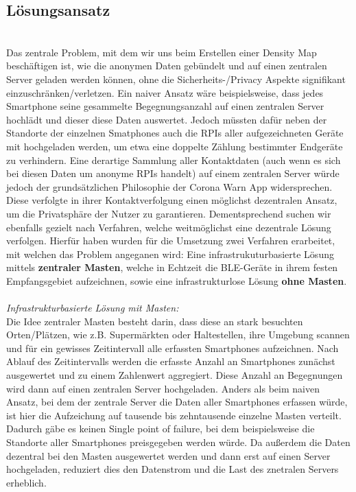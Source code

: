 \documentclass[conference,compsoc]{IEEEtran}
\begin{document}
\subsection{Lösungsansatz} \label{Lösungsansatz}
\text{ }\\
Das zentrale Problem, mit dem wir uns beim Erstellen einer Density Map beschäftigen ist, wie die anonymen Daten gebündelt und auf einen zentralen Server geladen werden können, ohne die Sicherheits-/Privacy Aspekte signifikant einzuschränken/verletzen. 
Ein naiver Ansatz wäre beispielsweise, dass jedes Smartphone seine gesammelte Begegnungsanzahl auf einen zentralen Server hochlädt und dieser diese Daten auswertet. 
Jedoch müssten dafür neben der Standorte der einzelnen Smatphones auch die RPIs aller aufgezeichneten Geräte mit hochgeladen werden, um etwa eine doppelte Zählung bestimmter Endgeräte zu verhindern. 
Eine derartige Sammlung aller Kontaktdaten (auch wenn es sich bei diesen Daten um anonyme RPIs handelt) auf einem zentralen Server würde jedoch der grundsätzlichen Philosophie der Corona Warn App widersprechen.
Diese verfolgte in ihrer Kontaktverfolgung einen möglichst dezentralen Ansatz, um die Privatsphäre der Nutzer zu garantieren.
Dementsprechend suchen wir ebenfalls gezielt nach Verfahren, welche weitmöglichst eine dezentrale Lösung verfolgen. 
Hierfür haben wurden für die Umsetzung zwei Verfahren erarbeitet, mit welchen das Problem angeganen wird: Eine infrastrukuturbasierte Lösung mittels \textbf{zentraler Masten}, welche in Echtzeit die BLE-Geräte in ihrem festen Empfangsgebiet aufzeichnen, sowie eine infrastrukturlose Lösung \textbf{ohne Masten}. \\ \\
\textit{Infrastrukturbasierte Lösung mit Masten: }\\
Die Idee zentraler Masten besteht darin, dass diese an stark besuchten Orten/Plätzen, wie z.B. Supermärkten oder Haltestellen, ihre Umgebung scannen und für ein gewisses Zeitintervall alle erfassten Smartphones aufzeichnen. 
Nach Ablauf des Zeitintervalls werden die erfasste Anzahl an Smartphones zunächst ausgewertet und zu einem Zahlenwert aggregiert.
Diese Anzahl an Begegnungen wird dann auf einen zentralen Server hochgeladen.
Anders als beim naiven Ansatz, bei dem der zentrale Server die Daten aller Smartphones erfassen würde, ist hier die Aufzeichung auf tausende bis zehntausende einzelne Masten verteilt. 
Dadurch gäbe es keinen \glqq Single point of failure\grqq, bei dem beispielsweise die Standorte aller Smartphones preisgegeben werden würde. 
Da außerdem die Daten dezentral bei den Masten ausgewertet werden und dann erst auf einen Server hochgeladen, reduziert dies den Datenstrom und die Last des znetralen Servers erheblich. 
\end{document}
